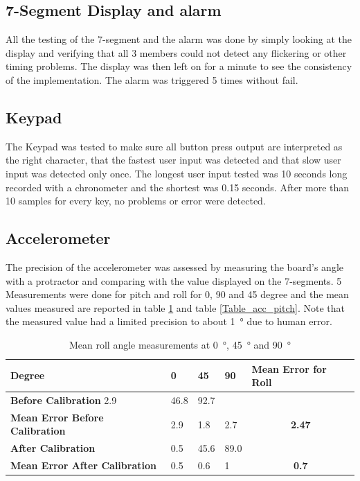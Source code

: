 \documentclass[12pt]{article}
\begin{document}
\subsection{7-Segment Display and alarm}
All the testing of the 7-segment and the alarm was done by simply looking at the display and verifying that all 3 members could not detect any flickering or other timing problems. The display was then left on for a minute to see the consistency of the implementation. The alarm was triggered 5 times without fail.
\subsection{Keypad}
The Keypad was tested to make sure all button press output are interpreted as the right character, that the fastest user input was detected and that slow user input was detected only once. The longest user input tested was 10 seconds long recorded with a chronometer and the shortest was 0.15 seconds. After more than 10 samples for every key, no problems or error were detected.

\subsection{Accelerometer}
The precision of the accelerometer was assessed by measuring the board's angle with a protractor and comparing with the value displayed on the 7-segments. 5 Measurements were done for pitch and roll for 0, 90 and 45 degree and the mean values measured are reported in table \ref{Table_acc_roll} and table \ref{Table_acc_pitch}. Note that the measured value had a limited precision to about \SI{1}{\degree} due to human error.

\begin{table}[!h]
\centering
\caption{Mean roll angle measurements at \SI{0}{\degree}, \SI{45}{\degree} and \SI{90}{\degree}}
\label{Table_acc_roll}
\begin{tabular}{lllll}
\hline
\textbf{Degree} & \textbf{0} & \textbf{45} & \textbf{90} & \textbf{Mean Error for Roll}
\\ \hline
\textbf{Before Calibration} 2.9 & 46.8 & 92.7
\\ \hline
\textbf{Mean Error Before Calibration} & 2.9 & 1.8 & 2.7 & \multicolumn{1}{c}{\textbf{2.47}}
\\ \hline
\textbf{After Calibration} & 0.5 & 45.6 & 89.0
\\ \hline
\textbf{Mean Error After Calibration} & 0.5 & 0.6 & 1 & \multicolumn{1}{c}{\textbf{0.7}}
\\ \hline
\end{tabular}
\end{table}
\end{document}
